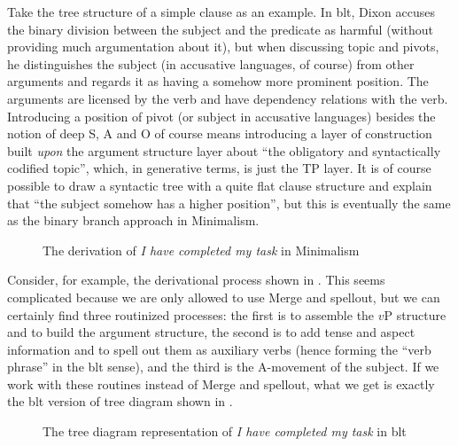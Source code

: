 \documentclass[../main.tex]{subfiles}
\begin{document}
Take the tree structure of a simple clause as an example. In \ac{blt}, Dixon accuses the binary division between 
the subject and the predicate as harmful (without providing much argumentation about it), but when discussing 
topic and pivots, he distinguishes the subject (in accusative languages, of course) from other arguments and regards it as having a somehow more 
prominent position. The arguments are licensed by the verb and have dependency relations with the verb. 
Introducing a position of pivot (or subject in accusative languages) besides the notion of deep S, A and O 
of course means introducing a layer of construction built \emph{upon} the argument structure layer
about ``the obligatory and syntactically codified topic'', 
which, in generative terms, is just the TP layer. It is of course possible to draw a syntactic tree 
with a quite flat clause structure and explain that ``the subject somehow has a higher position'', 
but this is eventually the same as the binary branch approach in Minimalism.

\begin{figure}
    \centering
    
    \caption{The derivation of \emph{I have completed my task} in Minimalism}
    \label{fig:complete-my-task-minimalism}
\end{figure}

Consider, for example, the derivational process shown in .
This seems complicated because we are only allowed to use Merge and spellout, but we can certainly 
find three routinized processes: the first is to assemble the $v$P structure and to build the argument 
structure, the second is to add tense and aspect information and to spell out them as auxiliary verbs
(hence forming the ``verb phrase'' in the \ac{blt} sense), and the third is the A-movement of the subject.
If we work with these routines instead of Merge and spellout, what we get is exactly the \ac{blt} version 
of tree diagram shown in .

\begin{figure}
    \centering
    
    \caption{The tree diagram representation of \emph{I have completed my task} in \ac{blt}}
    \label{fig:complete-my-task-blt-1}
\end{figure}
\end{document}
